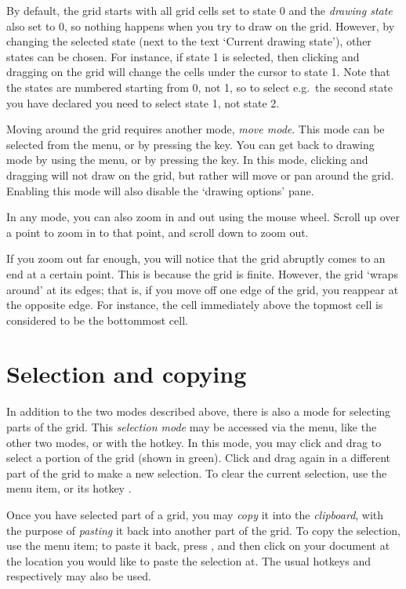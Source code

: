 \documentclass[oneside,a4paper]{memoir}
\begin{document}
By default, the grid starts with all grid cells set to state 0 and the \emph{drawing state} also set to 0,
  so nothing happens when you try to draw on the grid.
However, by changing the selected state (next to the text `Current drawing state'), other states can be chosen.
For instance, if state 1 is selected, then clicking and dragging on the grid will change the cells under the cursor to state 1.
Note that the states are numbered starting from 0, not 1,
  so to select e.g.\ the second state you have declared you need to select state 1, not state 2.

Moving around the grid requires another mode, \emph{move mode}.
This mode can be selected from the  menu, or by pressing the  key.
You can get back to drawing mode by using the  menu, or by pressing the  key.
In this mode, clicking and dragging will not draw on the grid, but rather will move or pan around the grid.
Enabling this mode will also disable the `drawing options' pane.

In any mode, you can also zoom in and out using the mouse wheel.
Scroll up over a point to zoom in to that point, and scroll down to zoom out.

If you zoom out far enough, you will notice that the grid abruptly comes to an end at a certain point.
This is because the grid is finite.
However, the grid `wraps around' at its edges; that is, if you move off one edge of the grid, you reappear at the opposite edge.
For instance, the cell immediately above the topmost cell is considered to be the bottommost cell.

\section{Selection and copying}
\label{sec:selcopy}

In addition to the two modes described above, there is also a mode for selecting parts of the grid.
This \emph{selection mode} may be accessed via the  menu, like the other two modes,
  or with the  hotkey.
In this mode, you may click and drag to select a portion of the grid (shown in green).
Click and drag again in a different part of the grid to make a new selection.
To clear the current selection, use the \hbox{} menu item,
  or its hotkey .

Once you have selected part of a grid, you may \emph{copy} it into the \emph{clipboard},
  with the purpose of \emph{pasting} it back into another part of the grid.
To copy the selection, use the  menu item;
  to paste it back, press ,
  and then click on your document at the location you would like to paste the selection at.
The usual hotkeys  and  respectively may also be used.
\end{document}
